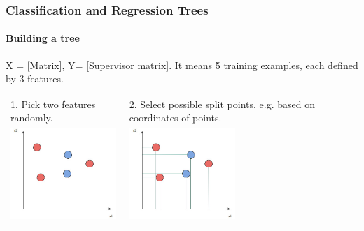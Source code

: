 \begin{frame}
	\frametitle{Classification and Regression Trees}
		\framesubtitle{Building a tree}

		X = [Matrix], Y= [Supervisor matrix]. It means 5 training examples, each defined by 3 features.
		\begin{center}
		\begin{tabular}{m{5cm} m{5cm}}
		1. Pick two features randomly.
		&
		2. Select possible split points, e.g. based on coordinates of points. \\
		\includegraphics[width=4cm]{./figures/macierz1}
		&
		\includegraphics[width=4cm]{./figures/macierz2}
		\\
		\end{tabular}
		\end{center}
		
\end{frame}


